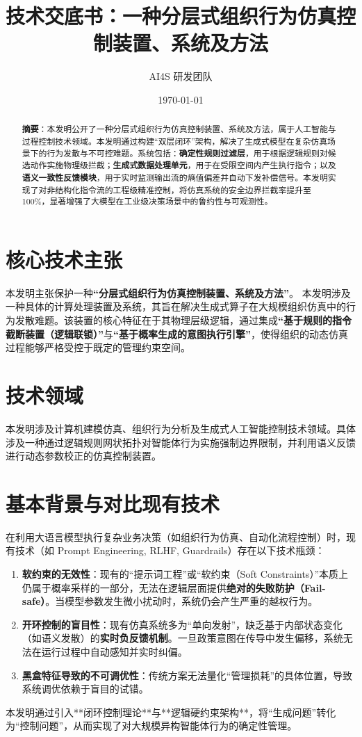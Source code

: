 \documentclass[UTF8, fontset=mac]{ctexart}
\title{\zihao{2}\heiti 技术交底书：一种分层式组织行为仿真控制装置、系统及方法}
\author{\zihao{4} AI4S 研发团队}
\date{\today}
\begin{document}
\maketitle

\begin{abstract}
     \textbf{摘要}：本发明公开了一种分层式组织行为仿真控制装置、系统及方法，属于人工智能与过程控制技术领域。本发明通过构建“双层闭环”架构，解决了生成式模型在复杂仿真场景下的行为发散与不可控难题。系统包括：\textbf{确定性规则过滤层}，用于根据逻辑规则对候选动作实施物理级拦截；\textbf{生成式数据处理单元}，用于在受限空间内产生执行指令；以及\textbf{语义一致性反馈模块}，用于实时监测输出流的熵值偏差并自动下发补偿信号。本发明实现了对非结构化指令流的工程级精准控制，将仿真系统的安全边界拦截率提升至 100\%，显著增强了大模型在工业级决策场景中的鲁约性与可观测性。
\end{abstract}

\section{核心技术主张}
本发明主张保护一种\textbf{“分层式组织行为仿真控制装置、系统及方法”}。
本发明涉及一种具体的计算处理装置及系统，其旨在解决生成式算子在大规模组织仿真中的行为发散难题。该装置的核心特征在于其物理层级逻辑，通过集成\textbf{“基于规则的指令截断装置（逻辑联锁）”}与\textbf{“基于概率生成的意图执行引擎”}，使得组织的动态仿真过程能够严格受控于既定的管理约束空间。

\section{技术领域}
本发明涉及计算机建模仿真、组织行为分析及生成式人工智能控制技术领域。具体涉及一种通过逻辑规则网状拓扑对智能体行为实施强制边界限制，并利用语义反馈进行动态参数校正的仿真控制装置。

\section{基本背景与对比现有技术}
在利用大语言模型执行复杂业务决策（如组织行为仿真、自动化流程控制）时，现有技术（如 Prompt Engineering, RLHF, Guardrails）存在以下技术瓶颈：
\begin{enumerate}
    \item \textbf{软约束的无效性}：现有的“提示词工程”或“软约束（Soft Constraints）”本质上仍属于概率采样的一部分，无法在逻辑层面提供\textbf{绝对的失败防护（Fail-safe）}。当模型参数发生微小扰动时，系统仍会产生严重的越权行为。
    \item \textbf{开环控制的盲目性}：现有仿真系统多为“单向发射”，缺乏基于内部状态变化（如语义发散）的\textbf{实时负反馈机制}。一旦政策意图在传导中发生偏移，系统无法在运行过程中自动感知并实时纠偏。
    \item \textbf{黑盒特征导致的不可调优性}：传统方案无法量化“管理损耗”的具体位置，导致系统调优依赖于盲目的试错。
\end{enumerate}
本发明通过引入**闭环控制理论**与**逻辑硬约束架构**，将“生成问题”转化为“控制问题”，从而实现了对大规模异构智能体行为的确定性管理。
\end{document}
